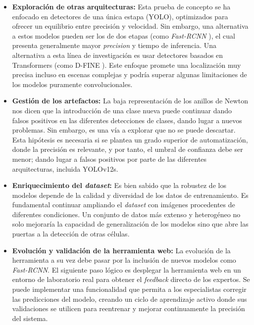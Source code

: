 \documentclass[12pt,a4paper,onecolumn,oneside]{report}
\begin{document}
\begin{itemize}
  \item \textbf{Exploración de otras arquitecturas:} Esta prueba de concepto se ha enfocado en detectores de una única estapa (YOLO), optimizados para ofrecer un equilibrio entre precisión y velocidad. Sin embargo, 
  una alternativa a estos modelos pueden ser los de dos etapas (como \textit{Fast-RCNN} \cite{7410526}), el cual presenta generalmente mayor \textit{precision} y tiempo de inferencia. Una alternativa a esta línea de investigación es usar detectores basados en Transformers
  (como D-FINE \cite{peng2024dfineredefineregressiontask}). Este enfoque promete una localización muy precisa incluso en escenas complejas y podría superar algunas limitaciones de los modelos puramente convolucionales.
  \item \textbf{Gestión de los artefactos:} La baja representación de los anillos de Newton nos dicen que la introducción de una clase nueva puede continuar dando falsos positivos en las diferentes detecciones de clases, dando lugar
  a nuevos problemas. Sin embargo, es una vía a explorar que no se puede descartar. Esta hipótesis es necesaria si se plantea un grado superior de automatización, donde la precisión es relevante, y por tanto, el umbral de confianza debe ser menor; 
  dando lugar a falsos positivos por parte de las diferentes arquitecturas, incluida YOLOv12s.
  \item \textbf{Enriquecimiento del \textit{dataset}:} Es bien sabido que la robustez de los modelos depende de la calidad y diversidad de los datos de entrenamiento. Es fundamental continuar ampliando el \textit{dataset} con imágenes procedentes de diferentes condiciones.
  Un conjunto de datos más extenso y heterogéneo no solo mejoraría la capacidad de generalización de los modelos sino que abre las puertas a la detección de otras células.
  \item \textbf{Evolución y validación de la herramienta web:} La evolución de la herramienta a su vez debe pasar por la inclusión de nuevos modelos como \textit{Fast-RCNN}. El siguiente paso lógico es desplegar la herramienta web en un entorno de laboratorio real 
  para obtener el \textit{feedback} directo de los expertos. Se puede implementar una funcionalidad que permita a los especialistas corregir las predicciones del modelo, creando un ciclo de aprendizaje activo donde sus validaciones se utilicen para reentrenar y mejorar continuamente la precisión del sistema.
\end{itemize}
\end{document}
